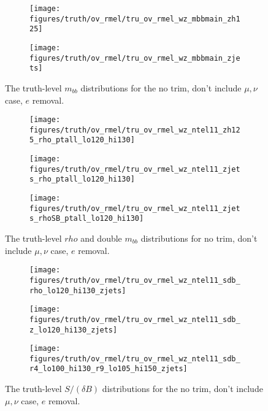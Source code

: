 \begin{figure}[!htbp]\captionsetup{justification=centering}
\begin{center}
\begin{subfigure}[t]{18pc}\centering\texttt{[image: figures/truth/ov\_rmel/tru\_ov\_rmel\_wz\_mbbmain\_zh125]}\caption{}\end{subfigure}
\begin{subfigure}[t]{18pc}\centering\texttt{[image: figures/truth/ov\_rmel/tru\_ov\_rmel\_wz\_mbbmain\_zjets]}\caption{}\end{subfigure}
\caption{\label{fig:mbbwz}The truth-level $m_{bb}$ distributions for the no trim, don't include $\mu,\nu$ case, $e$ removal.}
\end{center}
\end{figure}
\begin{figure}[!htbp]\captionsetup{justification=centering}
\begin{center}
\begin{subfigure}[t]{18pc}\centering\texttt{[image: figures/truth/ov\_rmel/tru\_ov\_rmel\_wz\_ntel11\_zh125\_rho\_ptall\_lo120\_hi130]}\caption{}\end{subfigure}
\begin{subfigure}[t]{18pc}\centering\texttt{[image: figures/truth/ov\_rmel/tru\_ov\_rmel\_wz\_ntel11\_zjets\_rho\_ptall\_lo120\_hi130]}\caption{}\end{subfigure}
\begin{subfigure}[t]{18pc}\centering\texttt{[image: figures/truth/ov\_rmel/tru\_ov\_rmel\_wz\_ntel11\_zjets\_rhoSB\_ptall\_lo120\_hi130]}\caption{}\end{subfigure}
\caption{\label{fig:mbbwz}The truth-level $rho$ and double $m_{bb}$ distributions for no trim, don't include $\mu,\nu$ case, $e$ removal.}
\end{center}
\end{figure}
\begin{figure}[!htbp]\captionsetup{justification=centering}
\begin{center}
\begin{subfigure}[t]{18pc}\centering\texttt{[image: figures/truth/ov\_rmel/tru\_ov\_rmel\_wz\_ntel11\_sdb\_rho\_lo120\_hi130\_zjets]}\caption{}\end{subfigure}
\begin{subfigure}[t]{18pc}\centering\texttt{[image: figures/truth/ov\_rmel/tru\_ov\_rmel\_wz\_ntel11\_sdb\_z\_lo120\_hi130\_zjets]}\caption{}\end{subfigure}
\begin{subfigure}[t]{18pc}\centering\texttt{[image: figures/truth/ov\_rmel/tru\_ov\_rmel\_wz\_ntel11\_sdb\_r4\_lo100\_hi130\_r9\_lo105\_hi150\_zjets]}\caption{}\end{subfigure}
\caption{\label{fig:mbbwz}The truth-level $S/(\delta B)$ distributions for the no trim, don't include $\mu,\nu$ case, $e$ removal.}
\end{center}
\end{figure}


